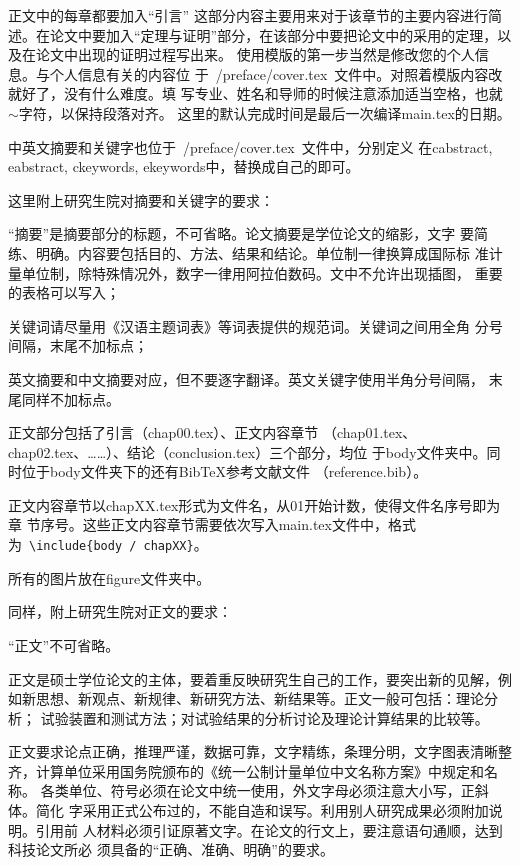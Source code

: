 
\label{chap01}
正文中的每章都要加入“引言”  这部分内容主要用来对于该章节的主要内容进行简述。在论文中要加入“定理与证明”部分，在该部分中要把论文中的采用的定理，以及在论文中出现的证明过程写出来。
使用模版的第一步当然是修改您的个人信息。与个人信息有关的内容位
于~{/preface/cover.tex}~文件中。对照着模版内容改就好了，没有什么难度。填
写专业、姓名和导师的时候注意添加适当空格，也就$\sim$字符，以保持段落对齐。
这里的默认完成时间是最后一次编译main.tex的日期。

中英文摘要和关键字也位于~{/preface/cover.tex}~文件中，分别定义
在cabstract, eabstract, ckeywords, ekeywords中，替换成自己的即可。

这里附上研究生院对摘要和关键字的要求：
\begin{asparaenum}
\item “摘要”是摘要部分的标题，不可省略。论文摘要是学位论文的缩影，文字
  要简练、明确。内容要包括目的、方法、结果和结论。单位制一律换算成国际标
  准计量单位制，除特殊情况外，数字一律用阿拉伯数码。文中不允许出现插图，
  重要的表格可以写入；
\item 关键词请尽量用《汉语主题词表》等词表提供的规范词。关键词之间用全角
  分号间隔，末尾不加标点；
\item 英文摘要和中文摘要对应，但不要逐字翻译。英文关键字使用半角分号间隔，
  末尾同样不加标点。
\end{asparaenum}

正文部分包括了引言（chap00.tex）、正文内容章节
（chap01.tex、chap02.tex、……）、结论（conclusion.tex）三个部分，均位
于body文件夹中。同时位于body文件夹下的还有Bib\TeX{}参考文献文件
（reference.bib）。

正文内容章节以chapXX.tex形式为文件名，从01开始计数，使得文件名序号即为章
节序号。这些正文内容章节需要依次写入main.tex文件中，格式
为~\texttt{\footnotesize \textbackslash include\{body / chapXX\}}。

所有的图片放在figure文件夹中。

同样，附上研究生院对正文的要求：

“正文”不可省略。

正文是硕士学位论文的主体，要着重反映研究生自己的工作，要突出新的见解，例
如新思想、新观点、新规律、新研究方法、新结果等。正文一般可包括：理论分析；
试验装置和测试方法；对试验结果的分析讨论及理论计算结果的比较等。

正文要求论点正确，推理严谨，数据可靠，文字精练，条理分明，文字图表清晰整
齐，计算单位采用国务院颁布的《统一公制计量单位中文名称方案》中规定和名称。
各类单位、符号必须在论文中统一使用，外文字母必须注意大小写，正斜体。简化
字采用正式公布过的，不能自造和误写。利用别人研究成果必须附加说明。引用前
人材料必须引证原著文字。在论文的行文上，要注意语句通顺，达到科技论文所必
须具备的“正确、准确、明确”的要求。

